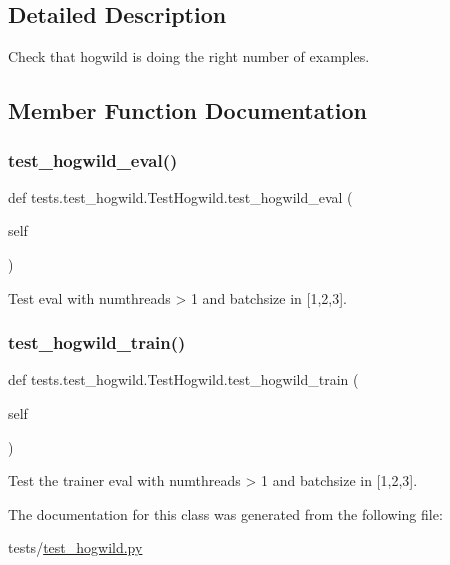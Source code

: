 \subsection{Detailed Description}
\begin{DoxyVerb}Check that hogwild is doing the right number of examples.
\end{DoxyVerb}
 

\subsection{Member Function Documentation}
\mbox{\label{classtests_1_1test__hogwild_1_1TestHogwild_a0d83543defe591e2c7db1a94dce52189}} 
\subsubsection{\texorpdfstring{test\+\_\+hogwild\+\_\+eval()}{test\_hogwild\_eval()}}
{\footnotesize\ttfamily def tests.\+test\+\_\+hogwild.\+Test\+Hogwild.\+test\+\_\+hogwild\+\_\+eval (\begin{DoxyParamCaption}\item[{}]{self }\end{DoxyParamCaption})}

\begin{DoxyVerb}Test eval with numthreads > 1 and batchsize in [1,2,3].
\end{DoxyVerb}
 \mbox{\label{classtests_1_1test__hogwild_1_1TestHogwild_a8ae07bb2d6dda177244cecb1900211b5}} 
\subsubsection{\texorpdfstring{test\+\_\+hogwild\+\_\+train()}{test\_hogwild\_train()}}
{\footnotesize\ttfamily def tests.\+test\+\_\+hogwild.\+Test\+Hogwild.\+test\+\_\+hogwild\+\_\+train (\begin{DoxyParamCaption}\item[{}]{self }\end{DoxyParamCaption})}

\begin{DoxyVerb}Test the trainer eval with numthreads > 1 and batchsize in [1,2,3].
\end{DoxyVerb}
 

The documentation for this class was generated from the following file\+:\begin{DoxyCompactItemize}
\item 
tests/\hyperlink{test__hogwild_8py}{test\+\_\+hogwild.\+py}\end{DoxyCompactItemize}
